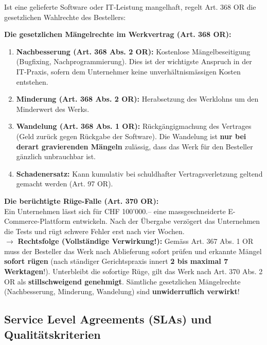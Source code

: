 Ist eine gelieferte Software oder IT-Leistung mangelhaft, regelt Art. 368 OR die gesetzlichen Wahlrechte des Bestellers:

\begin{definition}
    \textbf{Die gesetzlichen Mängelrechte im Werkvertrag (Art. 368 OR):}
    \begin{enumerate}
        \item \textbf{Nachbesserung (Art. 368 Abs. 2 OR):} Kostenlose Mängelbeseitigung (Bugfixing, Nachprogrammierung). Dies ist der wichtigste Anspruch in der IT-Praxis, sofern dem Unternehmer keine unverhältnismässigen Kosten entstehen.
        \item \textbf{Minderung (Art. 368 Abs. 2 OR):} Herabsetzung des Werklohns um den Minderwert des Werks.
        \item \textbf{Wandelung (Art. 368 Abs. 1 OR):} Rückgängigmachung des Vertrages (Geld zurück gegen Rückgabe der Software). Die Wandelung ist \textbf{nur bei derart gravierenden Mängeln} zulässig, dass das Werk für den Besteller gänzlich unbrauchbar ist.
        \item \textbf{Schadenersatz:} Kann kumulativ bei schuldhafter Vertragsverletzung geltend gemacht werden (Art. 97 OR).
    \end{enumerate}
\end{definition}

\begin{example}
    \textbf{Die berüchtigte Rüge-Falle (Art. 370 OR):} \\
    Ein Unternehmen lässt sich für CHF 100'000.-- eine massgeschneiderte E-Commerce-Plattform entwickeln. Nach der Übergabe verzögert das Unternehmen die Tests und rügt schwere Fehler erst nach vier Wochen. \\
    $\to$ \textbf{Rechtsfolge (Vollständige Verwirkung!):} Gemäss Art. 367 Abs. 1 OR muss der Besteller das Werk nach Ablieferung sofort prüfen und erkannte Mängel \textbf{sofort rügen} (nach ständiger Gerichtspraxis innert \textbf{2 bis maximal 7 Werktagen}!). Unterbleibt die sofortige Rüge, gilt das Werk nach Art. 370 Abs. 2 OR als \textbf{stillschweigend genehmigt}. Sämtliche gesetzlichen Mängelrechte (Nachbesserung, Minderung, Wandelung) sind \textbf{unwiderruflich verwirkt}!
\end{example}

\subsection{Service Level Agreements (SLAs) und Qualitätskriterien}

